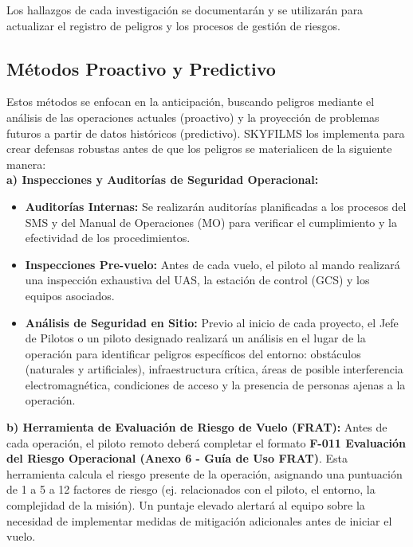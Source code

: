 Los hallazgos de cada investigación se documentarán y se utilizarán para actualizar el registro de peligros y los procesos de gestión de riesgos.

\subsection{Métodos Proactivo y Predictivo}
Estos métodos se enfocan en la anticipación, buscando peligros mediante el análisis de las operaciones actuales (proactivo) y la proyección de problemas futuros a partir de datos históricos (predictivo). SKYFILMS los implementa para crear defensas robustas antes de que los peligros se materialicen de la siguiente manera:\\

\textbf{a) Inspecciones y Auditorías de Seguridad Operacional:}

\begin{itemize}
    \item \textbf{Auditorías Internas:} Se realizarán auditorías planificadas a los procesos del SMS y del Manual de Operaciones (MO) para verificar el cumplimiento y la efectividad de los procedimientos.
    \item \textbf{Inspecciones Pre-vuelo:} Antes de cada vuelo, el piloto al mando realizará una inspección exhaustiva del UAS, la estación de control (GCS) y los equipos asociados.
    \item \textbf{Análisis de Seguridad en Sitio:} Previo al inicio de cada proyecto, el Jefe de Pilotos o un piloto designado realizará un análisis en el lugar de la operación para identificar peligros específicos del entorno: obstáculos (naturales y artificiales), infraestructura crítica, áreas de posible interferencia electromagnética, condiciones de acceso y la presencia de personas ajenas a la operación.
\end{itemize}

\textbf{b) Herramienta de Evaluación de Riesgo de Vuelo (FRAT):} Antes de cada operación, el piloto remoto deberá completar el formato \textbf{F-011 Evaluación del Riesgo Operacional (Anexo 6 - Guía de Uso FRAT)}. Esta herramienta calcula el riesgo presente de la operación, asignando una puntuación de 1 a 5 a 12 factores de riesgo (ej. relacionados con el piloto, el entorno, la complejidad de la misión). Un puntaje elevado alertará al equipo sobre la necesidad de implementar medidas de mitigación adicionales antes de iniciar el vuelo.

